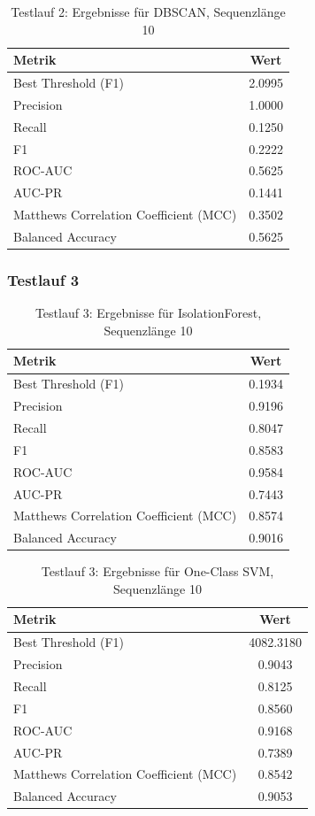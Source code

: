 \documentclass[a4paper,12pt]{article}
\begin{document}
\begin{table}[H]
	\centering
	\begin{tabular}{l c}
		\hline
		Metrik & Wert \\
		\hline
		Best Threshold (F1) & 2.0995 \\
		Precision & 1.0000 \\
		Recall & 0.1250 \\
		F1 & 0.2222 \\
		ROC-AUC & 0.5625 \\
		AUC-PR & 0.1441 \\
		Matthews Correlation Coefficient (MCC) & 0.3502 \\
		Balanced Accuracy & 0.5625 \\
		\hline
	\end{tabular}
	\caption{Testlauf 2: Ergebnisse für DBSCAN, Sequenzlänge 10}
\end{table}

\subsubsection{Testlauf 3}

\begin{table}[H]
	\centering
	\begin{tabular}{l c}
		\hline
		Metrik & Wert \\
		\hline
		Best Threshold (F1) & 0.1934 \\
		Precision & 0.9196 \\
		Recall & 0.8047 \\
		F1 & 0.8583 \\
		ROC-AUC & 0.9584 \\
		AUC-PR & 0.7443 \\
		Matthews Correlation Coefficient (MCC) & 0.8574 \\
		Balanced Accuracy & 0.9016 \\
		\hline
	\end{tabular}
	\caption{Testlauf 3: Ergebnisse für IsolationForest, Sequenzlänge 10}
\end{table}

\begin{table}[H]
	\centering
	\begin{tabular}{l c}
		\hline
		Metrik & Wert \\
		\hline
		Best Threshold (F1) & 4082.3180 \\
		Precision & 0.9043 \\
		Recall & 0.8125 \\
		F1 & 0.8560 \\
		ROC-AUC & 0.9168 \\
		AUC-PR & 0.7389 \\
		Matthews Correlation Coefficient (MCC) & 0.8542 \\
		Balanced Accuracy & 0.9053 \\
		\hline
	\end{tabular}
	\caption{Testlauf 3: Ergebnisse für One-Class SVM, Sequenzlänge 10}
\end{table}
\end{document}

